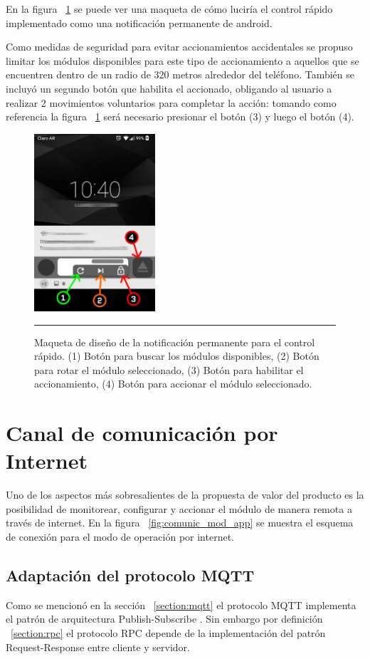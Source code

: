 En la figura ~\ref{fig:notif_design} se puede ver una maqueta de cómo luciría el control rápido implementado como una notificación permanente de android.

Como medidas de seguridad para evitar accionamientos accidentales se propuso limitar los módulos
disponibles para este tipo de accionamiento a aquellos que se encuentren dentro de un radio de 320 metros alrededor del teléfono. También se incluyó un segundo botón que habilita el accionado, obligando al usuario a realizar 2 movimientos voluntarios para completar la acción: tomando como referencia la figura ~\ref{fig:notif_design} será necesario presionar el botón (3) y luego el botón (4).


\begin{figure}[htbp]
	\centering
	\includegraphics[width=0.4\textwidth]{Figures/iter3/module_notif.png}
	\rule{35em}{1pt}
	\caption[Wireframe]{Maqueta de diseño de la notificación permanente para el control rápido. (1) Botón para buscar los módulos disponibles, (2) Botón para rotar el módulo seleccionado, (3) Botón para habilitar el accionamiento, (4) Botón para accionar el módulo seleccionado.}
	\label{fig:notif_design}
\end{figure}

\section{Canal de comunicación por Internet}
Uno de los aspectos más sobresalientes de la propuesta de valor del producto es la posibilidad
de monitorear, configurar y accionar el módulo de manera remota a través de internet.
En la figura ~\ref{fig:comunic_mod_app} se muestra el esquema de conexión para el modo de operación por internet.
\subsection{Adaptación del protocolo MQTT}
Como se mencionó en la sección ~\ref{section:mqtt} el protocolo MQTT implementa el patrón de arquitectura Publish-Subscribe .
Sin embargo por definición ~\ref{section:rpc} el protocolo RPC depende de la implementación del patrón Request-Response entre cliente y servidor. 

